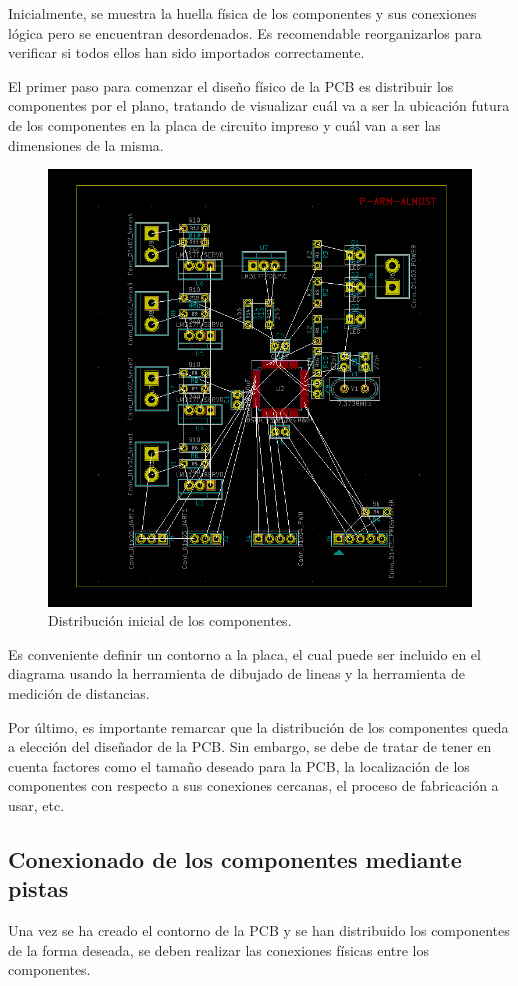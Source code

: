 Inicialmente, se muestra la huella física de los componentes y sus conexiones lógica pero se encuentran desordenados. Es recomendable reorganizarlos para verificar si todos ellos han sido importados correctamente.

El primer paso para comenzar el diseño físico de la \ac{PCB} es distribuir los componentes por el plano, tratando de visualizar cuál va a ser la ubicación futura de los componentes en la placa de circuito impreso y cuál van a ser las dimensiones de la misma.

\begin{figure}[H]
\centering 
\includegraphics[width=0.9\linewidth]{pictures/DistribucionInicial.PNG}
\caption{Distribución inicial de los componentes.}
\label{fig:CAMBIAR!!!!!!!!!!}
\end{figure}

Es conveniente definir un contorno a la placa, el cual puede ser incluido en el diagrama usando la herramienta de dibujado de lineas y la herramienta de medición de distancias.

Por último, es importante remarcar que la distribución de los componentes queda a elección del diseñador de la \ac{PCB}. Sin embargo, se debe de tratar de tener en cuenta factores como el tamaño deseado para la \ac{PCB}, la localización de los componentes con respecto a sus conexiones cercanas, el proceso de fabricación a usar, etc.

\subsection{Conexionado de los componentes mediante pistas}
Una vez se ha creado el contorno de la \ac{PCB} y se han distribuido los componentes de la forma deseada, se deben realizar las conexiones físicas entre los componentes.

